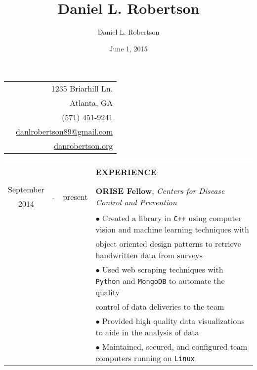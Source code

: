 \documentclass[10pt]{article}
\title{Daniel L. Robertson}
\date{June 1, 2015}
\author{Daniel L. Robertson}
\begin{document}
    \normalfont
    \begin{table}[ht]
        \begin{tabular}{p{13cm}r}
            \multirow{5}{*}{\hspace*{1cm}\color{maroon}{\huge\textbf{Daniel L. Robertson}}} & 1235 Briarhill Ln.\\
            & Atlanta, GA\\
            & (571) 451-9241\\
            & \href{mailto:danlrobertson89@gmail.com}{danlrobertson89@gmail.com}\\
            & \href{http://danrobertson.org}{danrobertson.org}\\
        \end{tabular}
        \begin{tabular}{@{\hspace{0mm}}c@{\hspace{1mm}}c@{\hspace{3mm}}cl}
            & & & \color{maroon}{\rule{14cm}{0.75pt}}\\
            & & & \large{\textbf{EXPERIENCE}}\\
            & & & \color{maroon}{\rule{14cm}{0.75pt}}\\
            September & \multirow{2}{*}{-} & \multirow{2}{*}{present} & \multirow{2}{*}{\textbf{ORISE Fellow}, \textit{Centers for Disease Control and Prevention}}\\
            2014 & & &\\
            & & & $\bullet$ Created a library in \texttt{C++} using computer vision and machine learning techniques with\\
            & & & \hspace*{4mm}object oriented design patterns to retrieve handwritten data from surveys\\
            & & & $\bullet$ Used web scraping techniques with \texttt{Python} and \texttt{MongoDB} to automate the quality\\
            & & & \hspace*{4mm}control of data deliveries to the team\\
            & & & $\bullet$ Provided high quality data visualizations to aide in the analysis of data\\
            & & & $\bullet$ Maintained, secured, and configured team computers running on \texttt{Linux}\\

\end{tabular}
\end{table}
\end{document}
